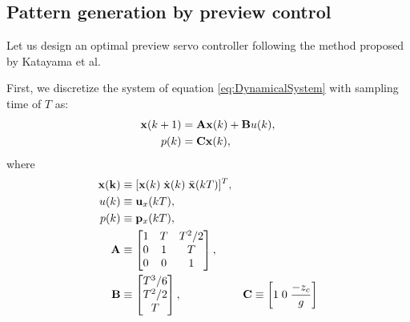 \subsection{Pattern generation by preview control}
Let us design an optimal preview servo controller following the method proposed
by Katayama et al. 
\par
First, we discretize the system of equation \ref{eq:DynamicalSystem} with sampling
 time of $T$ as:
\begin{equation}
\begin{aligned}
{\bf x}(k+1) &= {\bf Ax} (k) + {\bf B}u(k),\\
p(k) &= {\bf Cx}(k),
\end{aligned}
\label{eq:DiscreteDS}
\end{equation}
where
\begin{equation}
\begin{aligned}
\bf{x}(k) & \equiv [ {\bf x}(k)\; \dot{\bf x}(k)\; \ddot{\bf x}(kT) ]^T , \\
u(k) & \equiv {\bf u}_x(kT) , \\
p(k) & \equiv {\bf p}_x(kT) , \\
{\bf A} & \equiv 
\left[
\begin{matrix}
1 & T & T^2/2 \\
0 & 1 & T \\
0 & 0 & 1
\end{matrix}
\right],\\
{\bf B} & \equiv 
\left[
\begin{matrix}
T^3/6 \\
T^2/2 \\
T
\end{matrix}
\right],
&
{\bf C}  \equiv
\left[
1 \; 0 \; \frac{-z_c}{g}
\right]
\end{aligned}
\end{equation}
\clearpage
